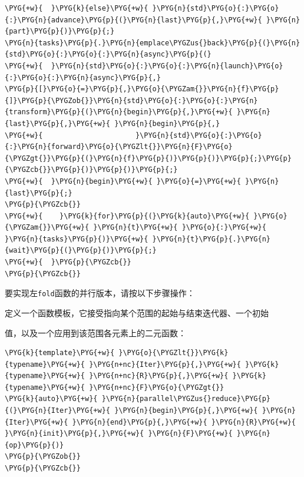 \begin{codeblockbg}
\begin{Verbatim}[commandchars=\\\{\},breaklines=true,breakanywhere=true,fontsize=\codefont,xleftmargin=17bp]
\PYG{+w}{  }\PYG{k}{else}\PYG{+w}{ }\PYG{n}{std}\PYG{o}{:}\PYG{o}{:}\PYG{n}{advance}\PYG{p}{(}\PYG{n}{last}\PYG{p}{,}\PYG{+w}{ }\PYG{n}{part}\PYG{p}{)}\PYG{p}{;}
\PYG{n}{tasks}\PYG{p}{.}\PYG{n}{emplace\PYGZus{}back}\PYG{p}{(}\PYG{n}{std}\PYG{o}{:}\PYG{o}{:}\PYG{n}{async}\PYG{p}{(}
\PYG{+w}{  }\PYG{n}{std}\PYG{o}{:}\PYG{o}{:}\PYG{n}{launch}\PYG{o}{:}\PYG{o}{:}\PYG{n}{async}\PYG{p}{,}
\PYG{p}{[}\PYG{o}{=}\PYG{p}{,}\PYG{o}{\PYGZam{}}\PYG{n}{f}\PYG{p}{]}\PYG{p}{\PYGZob{}}\PYG{n}{std}\PYG{o}{:}\PYG{o}{:}\PYG{n}{transform}\PYG{p}{(}\PYG{n}{begin}\PYG{p}{,}\PYG{+w}{ }\PYG{n}{last}\PYG{p}{,}\PYG{+w}{ }\PYG{n}{begin}\PYG{p}{,}
\PYG{+w}{                      }\PYG{n}{std}\PYG{o}{:}\PYG{o}{:}\PYG{n}{forward}\PYG{o}{\PYGZlt{}}\PYG{n}{F}\PYG{o}{\PYGZgt{}}\PYG{p}{(}\PYG{n}{f}\PYG{p}{)}\PYG{p}{)}\PYG{p}{;}\PYG{p}{\PYGZcb{}}\PYG{p}{)}\PYG{p}{)}\PYG{p}{;}
\PYG{+w}{  }\PYG{n}{begin}\PYG{+w}{ }\PYG{o}{=}\PYG{+w}{ }\PYG{n}{last}\PYG{p}{;}
\PYG{p}{\PYGZcb{}}
\PYG{+w}{    }\PYG{k}{for}\PYG{p}{(}\PYG{k}{auto}\PYG{+w}{ }\PYG{o}{\PYGZam{}}\PYG{+w}{ }\PYG{n}{t}\PYG{+w}{ }\PYG{o}{:}\PYG{+w}{ }\PYG{n}{tasks}\PYG{p}{)}\PYG{+w}{ }\PYG{n}{t}\PYG{p}{.}\PYG{n}{wait}\PYG{p}{(}\PYG{p}{)}\PYG{p}{;}
\PYG{+w}{  }\PYG{p}{\PYGZcb{}}
\PYG{p}{\PYGZcb{}}
\end{Verbatim}
\end{codeblockbg}



要实现左\texttt{fold}函数的并行版本，请按以下步骤操作：



定义一个函数模板，它接受指向某个范围的起始与结束迭代器、一个初始



值，以及一个应用到该范围各元素上的二元函数：



\begin{codeblockbg}
\begin{Verbatim}[commandchars=\\\{\},breaklines=true,breakanywhere=true,fontsize=\codefont,xleftmargin=17bp]
\PYG{k}{template}\PYG{+w}{ }\PYG{o}{\PYGZlt{}}\PYG{k}{typename}\PYG{+w}{ }\PYG{n+nc}{Iter}\PYG{p}{,}\PYG{+w}{ }\PYG{k}{typename}\PYG{+w}{ }\PYG{n+nc}{R}\PYG{p}{,}\PYG{+w}{ }\PYG{k}{typename}\PYG{+w}{ }\PYG{n+nc}{F}\PYG{o}{\PYGZgt{}}
\PYG{k}{auto}\PYG{+w}{ }\PYG{n}{parallel\PYGZus{}reduce}\PYG{p}{(}\PYG{n}{Iter}\PYG{+w}{ }\PYG{n}{begin}\PYG{p}{,}\PYG{+w}{ }\PYG{n}{Iter}\PYG{+w}{ }\PYG{n}{end}\PYG{p}{,}\PYG{+w}{ }\PYG{n}{R}\PYG{+w}{ }\PYG{n}{init}\PYG{p}{,}\PYG{+w}{ }\PYG{n}{F}\PYG{+w}{ }\PYG{n}{op}\PYG{p}{)}
\PYG{p}{\PYGZob{}}
\PYG{p}{\PYGZcb{}}
\end{Verbatim}
\end{codeblockbg}


